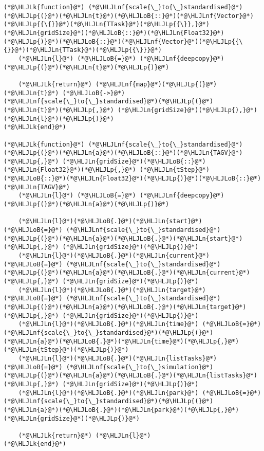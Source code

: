 \documentclass[12pt,a4paper]{article}
\newcommand{\HLJLk}[1]{\textcolor[RGB]{148,91,176}{\textbf{#1}}}
\newcommand{\HLJLn}[1]{#1}
\newcommand{\HLJLnf}[1]{\textcolor[RGB]{66,102,213}{#1}}
\newcommand{\HLJLoB}[1]{\textcolor[RGB]{102,102,102}{\textbf{#1}}}
\newcommand{\HLJLp}[1]{#1}
\begin{document}
\begin{lstlisting}
(*@\HLJLk{function}@*) (*@\HLJLnf{scale{\_}to{\_}standardised}@*)(*@\HLJLp{(}@*)(*@\HLJLn{t}@*)(*@\HLJLoB{::}@*)(*@\HLJLnf{Vector}@*)(*@\HLJLp{{\{}}@*)(*@\HLJLn{TTask}@*)(*@\HLJLp{{\}},}@*) (*@\HLJLn{gridSize}@*)(*@\HLJLoB{::}@*)(*@\HLJLn{Float32}@*)(*@\HLJLp{)}@*)(*@\HLJLoB{::}@*)(*@\HLJLnf{Vector}@*)(*@\HLJLp{{\{}}@*)(*@\HLJLn{TTask}@*)(*@\HLJLp{{\}}}@*)
    (*@\HLJLn{l}@*) (*@\HLJLoB{=}@*) (*@\HLJLnf{deepcopy}@*)(*@\HLJLp{(}@*)(*@\HLJLn{t}@*)(*@\HLJLp{)}@*)

    (*@\HLJLk{return}@*) (*@\HLJLnf{map}@*)(*@\HLJLp{(}@*)(*@\HLJLn{t}@*) (*@\HLJLoB{->}@*) (*@\HLJLnf{scale{\_}to{\_}standardised}@*)(*@\HLJLp{(}@*)(*@\HLJLn{t}@*)(*@\HLJLp{,}@*) (*@\HLJLn{gridSize}@*)(*@\HLJLp{),}@*) (*@\HLJLn{l}@*)(*@\HLJLp{)}@*)
(*@\HLJLk{end}@*)

(*@\HLJLk{function}@*) (*@\HLJLnf{scale{\_}to{\_}standardised}@*)(*@\HLJLp{(}@*)(*@\HLJLn{a}@*)(*@\HLJLoB{::}@*)(*@\HLJLn{TAGV}@*)(*@\HLJLp{,}@*) (*@\HLJLn{gridSize}@*)(*@\HLJLoB{::}@*)(*@\HLJLn{Float32}@*)(*@\HLJLp{,}@*) (*@\HLJLn{tStep}@*)(*@\HLJLoB{::}@*)(*@\HLJLn{Float32}@*)(*@\HLJLp{)}@*)(*@\HLJLoB{::}@*)(*@\HLJLn{TAGV}@*)
    (*@\HLJLn{l}@*) (*@\HLJLoB{=}@*) (*@\HLJLnf{deepcopy}@*)(*@\HLJLp{(}@*)(*@\HLJLn{a}@*)(*@\HLJLp{)}@*)

    (*@\HLJLn{l}@*)(*@\HLJLoB{.}@*)(*@\HLJLn{start}@*) (*@\HLJLoB{=}@*) (*@\HLJLnf{scale{\_}to{\_}standardised}@*)(*@\HLJLp{(}@*)(*@\HLJLn{a}@*)(*@\HLJLoB{.}@*)(*@\HLJLn{start}@*)(*@\HLJLp{,}@*) (*@\HLJLn{gridSize}@*)(*@\HLJLp{)}@*)
    (*@\HLJLn{l}@*)(*@\HLJLoB{.}@*)(*@\HLJLn{current}@*) (*@\HLJLoB{=}@*) (*@\HLJLnf{scale{\_}to{\_}standardised}@*)(*@\HLJLp{(}@*)(*@\HLJLn{a}@*)(*@\HLJLoB{.}@*)(*@\HLJLn{current}@*)(*@\HLJLp{,}@*) (*@\HLJLn{gridSize}@*)(*@\HLJLp{)}@*)
    (*@\HLJLn{l}@*)(*@\HLJLoB{.}@*)(*@\HLJLn{target}@*) (*@\HLJLoB{=}@*) (*@\HLJLnf{scale{\_}to{\_}standardised}@*)(*@\HLJLp{(}@*)(*@\HLJLn{a}@*)(*@\HLJLoB{.}@*)(*@\HLJLn{target}@*)(*@\HLJLp{,}@*) (*@\HLJLn{gridSize}@*)(*@\HLJLp{)}@*)
    (*@\HLJLn{l}@*)(*@\HLJLoB{.}@*)(*@\HLJLn{time}@*) (*@\HLJLoB{=}@*) (*@\HLJLnf{scale{\_}to{\_}standardised}@*)(*@\HLJLp{(}@*)(*@\HLJLn{a}@*)(*@\HLJLoB{.}@*)(*@\HLJLn{time}@*)(*@\HLJLp{,}@*) (*@\HLJLn{tStep}@*)(*@\HLJLp{)}@*)
    (*@\HLJLn{l}@*)(*@\HLJLoB{.}@*)(*@\HLJLn{listTasks}@*) (*@\HLJLoB{=}@*) (*@\HLJLnf{scale{\_}to{\_}simulation}@*)(*@\HLJLp{(}@*)(*@\HLJLn{a}@*)(*@\HLJLoB{.}@*)(*@\HLJLn{listTasks}@*)(*@\HLJLp{,}@*) (*@\HLJLn{gridSize}@*)(*@\HLJLp{)}@*)
    (*@\HLJLn{l}@*)(*@\HLJLoB{.}@*)(*@\HLJLn{park}@*) (*@\HLJLoB{=}@*) (*@\HLJLnf{scale{\_}to{\_}standardised}@*)(*@\HLJLp{(}@*)(*@\HLJLn{a}@*)(*@\HLJLoB{.}@*)(*@\HLJLn{park}@*)(*@\HLJLp{,}@*) (*@\HLJLn{gridSize}@*)(*@\HLJLp{)}@*)

    (*@\HLJLk{return}@*) (*@\HLJLn{l}@*)
(*@\HLJLk{end}@*)
\end{lstlisting}
\end{document}
